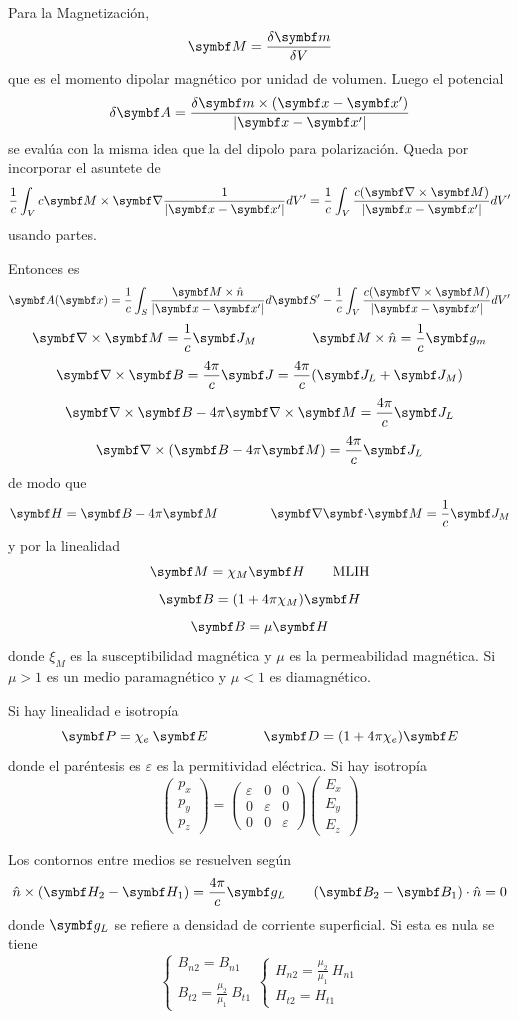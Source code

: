 \documentclass[10pt,oneside]{CBFT_book}
\begin{document}

Para la Magnetización,
\[
	\vb{M} = \frac{\delta \vb{m}}{\delta V}
\]
que es el momento dipolar magnético por unidad de volumen. Luego el potencial 
\[
	\delta\vb{A} = \frac{ \delta \vb{m} \times ( \vbx - \vbx') }{|\vbx - \vbx'|}
\]
se evalúa con la misma idea que la del dipolo para polarización.
Queda por incorporar el asuntete de 
\[
	\frac{1}{c} \int_V c \vb{M} \times \Nabla\frac{ 1 }{|\vb{x}-\vb{x}'|}  dV'
	= \frac{1}{c} \int_V \frac{ c(\rotorm{M}) }{|\vb{x}-\vb{x}'|}  dV'
\]
usando partes.


Entonces es
\[
	\vb{A}( \vb{x}) = \frac{1}{c} \int_S 
	\frac{ \vb{M}\times\hat{n} }{|\vb{x}-\vb{x}'|} d\vb{S}' - 
	\frac{1}{c} \int_V \frac{ c(\rotorm{M}) }{|\vb{x}-\vb{x}'|}  dV'
\]
\[
	\rotorm{M} = \frac{1}{c}\vb{J}_M \qquad \qquad \vb{M}\times\hat{n} = \frac{1}{c}\vb{g}_m
\]
\[
	\rotorm{B} = \frac{4\pi}{c}\vb{J}  = \frac{4\pi}{c}( \vb{J}_L + \vb{J}_M )
\]
\[
	\rotorm{B} - 4\pi \rotorm{M} = \frac{4\pi}{c}\vb{J}_L
\]
\[
	\Nabla\times( \vb{B} - 4\pi\vb{M} ) = \frac{4\pi}{c}\vb{J}_L 
\]
de modo que
\[
	\vb{H} = \vb{B} - 4 \pi \vb{M} \qquad \qquad \divem{M} = \frac{1}{c}\vb{J}_M  
\]
y por la linealidad
\[
	\vb{M} = \chi_M \vb{H} \qquad \text{MLIH}
\]
\[
	\vb{B} = ( 1 + 4\pi\chi_M ) \vb{H} 
\]
\[
	\vb{B} = \mu \vb{H}
\]
donde $\xi_M$ es la susceptibilidad magnética y $\mu$ es la permeabilidad magnética.
Si $\mu > 1 $ es un medio paramagnético y $\mu < 1$ es diamagnético.


Si hay linealidad e isotropía
\[
	\vb{P} = \chi_e \: \vb{E} \qquad \qquad \vb{D} = ( 1 + 4 \pi \chi_e ) \vb{E}
\]
donde el paréntesis es $\varepsilon$ es la permitividad eléctrica.
Si hay isotropía
\[
	\begin{pmatrix}
		p_x \\
		p_y \\
		p_z
	\end{pmatrix} 
	=
	\begin{pmatrix}
		\varepsilon & 0 & 0 \\
		0 & \varepsilon & 0 \\
		0 & 0 & \varepsilon
	\end{pmatrix} 
	\begin{pmatrix}
		E_x \\
		E_y \\
		E_z
	\end{pmatrix} 
\]


Los contornos entre medios se resuelven según
\[
	\hat{n} \times (\vb{H}_2 -\vb{H}_1) = \frac{4 \pi}{c} \vb{g}_L \qquad 
	(\vb{B}_2 -\vb{B}_1)\cdot\hat{n} = 0 
\]
donde $\vb{g}_L$ se refiere a densidad de corriente superficial.
Si esta es nula se tiene
\[
	\begin{cases}
	B_{n2} = B_{n1} \\
	\\
	B_{t2} = \frac{\mu_2}{\mu_1}\: B_{t1}
	\end{cases}
	\begin{cases}
	H_{n2} = \frac{\mu_2}{\mu_1}\: H_{n1} \\
	H_{t2} = H_{t1} 
	\end{cases}
\]
\end{document}
